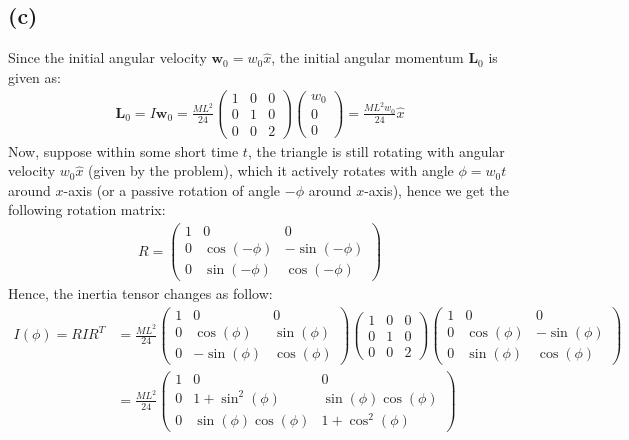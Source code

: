 \documentclass{article}
\newcommand{\bL}{\textbf{L}} %
\newcommand{\bw}{\textbf{w}} %
\begin{document}
\subsection*{(c)}
Since the initial angular velocity $\bw_0 = w_0\hat{x}$, the initial angular momentum $\bL_0$ is given as:
\begin{align}
    \bL_0=I\bw_0 = \frac{ML^2}{24}\begin{pmatrix}
        1&0&0\\0&1&0\\0&0&2
    \end{pmatrix}\begin{pmatrix}
        w_0\\0\\0
    \end{pmatrix} = \frac{ML^2w_0}{24}\hat{x}
\end{align}
Now, suppose within some short time $t$, the triangle is still rotating with angular velocity $w_0\hat{x}$ (given by the problem), which it actively rotates with angle $\phi=w_0t$ around $x$-axis (or a passive rotation of angle $-\phi$ around $x$-axis), hence we get the following rotation matrix:
\begin{align}
    R=\begin{pmatrix}
        1&0&0\\
        0&\cos(-\phi) &-\sin(-\phi)\\
        0&\sin(-\phi)&\cos(-\phi)
    \end{pmatrix}
\end{align}
Hence, the inertia tensor changes as follow:
\begin{align}
    I(\phi) = RIR^T &= \frac{ML^2}{24}\begin{pmatrix}
        1&0&0\\
        0&\cos(\phi) &\sin(\phi)\\
        0&-\sin(\phi)&\cos(\phi)
    \end{pmatrix}\begin{pmatrix}
        1&0&0\\0&1&0\\0&0&2
    \end{pmatrix}\begin{pmatrix}
        1&0&0\\
        0&\cos(\phi) &-\sin(\phi)\\
        0&\sin(\phi)&\cos(\phi)
    \end{pmatrix}\\
    &=\frac{ML^2}{24}\begin{pmatrix}
        1&0&0\\
        0&1+\sin^2(\phi)&\sin(\phi)\cos(\phi)\\
        0&\sin(\phi)\cos(\phi) & 1+\cos^2(\phi)
    \end{pmatrix}
\end{align}
\end{document}
